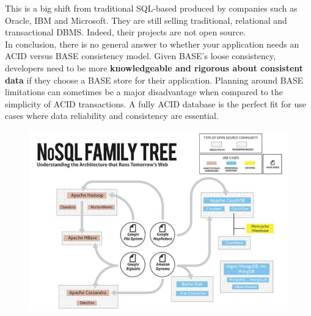 \documentclass[10pt,a4paper]{article}
\begin{document}
This is a big shift from traditional SQL-based produced by companies such as Oracle, IBM and Microsoft. They are still selling traditional, relational and transactional DBMS. Indeed, their projects are not open source. \\ \vspace{1em}
In conclusion, there is no general answer to whether your application needs an ACID versus BASE consistency model. Given BASE's loose consistency, developers need to be more \textbf{knowledgeable and rigorous about consistent data} if they choose a BASE store for their application. Planning around BASE limitations can sometimes be a major disadvantage when compared to the simplicity of ACID transactions. A fully ACID database is the perfect fit for use cases where data reliability and consistency are essential.
\begin{figure}[h!]
 \hfill \includegraphics[width=350pt]{images/nosqlfamtree.png}\hspace*{\fill}
  \label{fig:nosqlfamtree}
\end{figure} 
\end{document}
